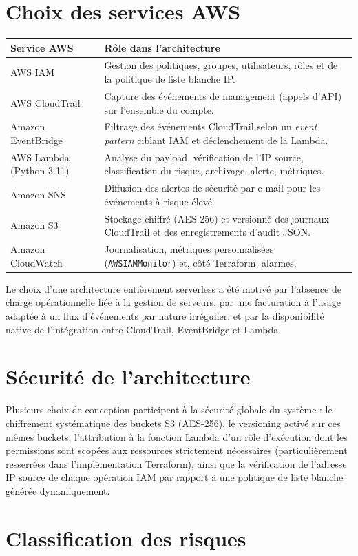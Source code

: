\documentclass[11pt,a4paper]{report}
\newcommand{\techtable}[3]{%
\begin{center}
\renewcommand{\arraystretch}{1.3}
\begin{tabularx}{\linewidth}{l X}
\toprule
\textbf{#2} & \textbf{#3} \\
\midrule
#1
\bottomrule
\end{tabularx}
\end{center}
}
\begin{document}
\section{Choix des services AWS}

\techtable{
AWS IAM & Gestion des politiques, groupes, utilisateurs, rôles et de la politique de liste blanche IP. \\
AWS CloudTrail & Capture des événements de management (appels d'API) sur l'ensemble du compte. \\
Amazon EventBridge & Filtrage des événements CloudTrail selon un \textit{event pattern} ciblant IAM et déclenchement de la Lambda. \\
AWS Lambda (Python 3.11) & Analyse du payload, vérification de l'IP source, classification du risque, archivage, alerte, métriques. \\
Amazon SNS & Diffusion des alertes de sécurité par e-mail pour les événements à risque élevé. \\
Amazon S3 & Stockage chiffré (AES-256) et versionné des journaux CloudTrail et des enregistrements d'audit JSON. \\
Amazon CloudWatch & Journalisation, métriques personnalisées (\texttt{AWSIAMMonitor}) et, côté Terraform, alarmes. \\
}{Service AWS}{Rôle dans l'architecture}

Le choix d'une architecture entièrement serverless a été motivé par l'absence de charge opérationnelle liée à la gestion de serveurs, par une facturation à l'usage adaptée à un flux d'événements par nature irrégulier, et par la disponibilité native de l'intégration entre CloudTrail, EventBridge et Lambda.

\section{Sécurité de l'architecture}

Plusieurs choix de conception participent à la sécurité globale du système : le chiffrement systématique des buckets S3 (AES-256), le versioning activé sur ces mêmes buckets, l'attribution à la fonction Lambda d'un rôle d'exécution dont les permissions sont scopées aux ressources strictement nécessaires (particulièrement resserrées dans l'implémentation Terraform), ainsi que la vérification de l'adresse IP source de chaque opération IAM par rapport à une politique de liste blanche générée dynamiquement.

\section{Classification des risques}
\end{document}
